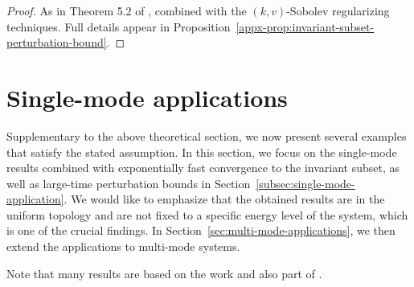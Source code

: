\documentclass[11pt]{article}
\theoremstyle{myplain}
\theoremstyle{mydefinition}
\theoremstyle{remark}
\DeclareMathOperator{\1}{\mathds{1}}
\begin{document}
        \begin{proof}
            As in Theorem 5.2 of \cite{Gondolf.2024}, combined with the $(k,v)$-Sobolev regularizing techniques. Full details appear in Proposition~\ref{appx-prop:invariant-subset-perturbation-bound}.
        \end{proof}



\section{Single-mode applications}\label{sec:single-mode-applications}
    Supplementary to the above theoretical section, we now present several examples that satisfy the stated assumption. In this section, we focus on the single-mode results combined with exponentially fast convergence to the invariant subset, as well as large-time perturbation bounds in Section~\ref{subsec:single-mode-application}. We would like to emphasize that the obtained results are in the uniform topology and are not fixed to a specific energy level of the system, which is one of the crucial findings. In Section~\ref{sec:multi-mode-applications}, we then extend the applications to multi-mode systems.

    \noindent Note that many results are based on the work \cite{Gondolf.2024} and also part of \cite{Gondolf.2025thesis}.
\end{document}
